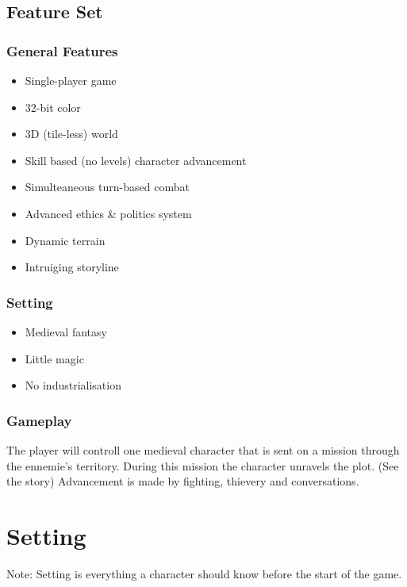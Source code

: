 \documentclass[a4paper]{report}
\begin{document}
	\chapter{Feature Set}

		\section{General Features}

			\begin{itemize}
				\item Single-player game
				\item 32-bit color
				\item 3D (tile-less) world
				\item Skill based (no levels) character advancement
				\item Simulteaneous turn-based combat
				\item Advanced ethics \& politics system
				\item Dynamic terrain
				\item Intruiging storyline
			\end{itemize}

		\section{Setting}\label{setting}

			\begin{itemize}
				\item Medieval fantasy
				\item Little magic
				\item No industrialisation
			\end{itemize}

		\section{Gameplay}

			The player will controll one medieval character that is sent on a mission through the ennemie's territory. During this mission the character unravels the plot. (See the story) Advancement is made by fighting, thievery and conversations.

\part{Setting}

Note: Setting is everything a character should know before the start of the game.
\end{document}
